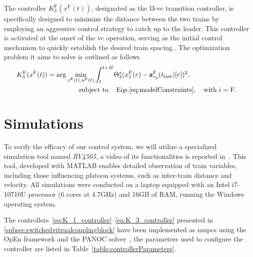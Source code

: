 \documentclass[letterpaper, 10 pt, conference]{ieeeconf}
\theoremstyle{definition}
\theoremstyle{nopoint}
\newcommand{\tildeAdd}{~}
\begin{document}
The controller $K^{\mathrm{F}}_3(x^{\mathrm{F}}(t))$, designated as the \gls{l3}-\gls{vc} transition controller, is specifically designed to minimize the distance between the two trains by employing an aggressive control strategy to catch up to the leader. This controller is activated at the onset of the \gls{vc} operation, serving as the initial control mechanism to quickly establish the desired train spacing.. The optimization problem it aims to solve is outlined as follows
%
\begin{equation}
	\label{eq:K_3_controller}
	\begin{aligned}
		K^{\mathrm{F}}_3(x^\mathrm{F}(t)) = \arg  \min_{x^{\mathrm{F}}(t), u^{\mathrm{F}}(t)} \int_{t}^{t+H}& \Theta^s_3(x_1^{\mathrm{F}}(r)-\mathbf{z}_{\tau_2}^\mathrm{F}(t_{\mathrm{last}})[r])^2, \\
		&	\hspace{-1.8cm} \text{subject to} \qquad \hspace{-1cm}  \qquad \mathrm{Eqs.}\eqref{eq:modelConstraints}, \quad \mathrm{with} \; i = \mathrm{F}.
	\end{aligned}
\end{equation}






 
\section{Simulations}
 \label{sec:Simulations}
 
  To verify the efficacy of our control system, we will utilize a specialized simulation tool named \textit{RV4565}, a video of its functionalities is reported in\tildeAdd\cite{youtubeVideo}. This tool, developed with MATLAB enables detailed observation of train variables, including those influencing platoon systems, such as inter-train distance and velocity. All simulations were conducted on a laptop equipped with an Intel i7-10710U processor (6 cores at 4.7GHz) and 16GB of RAM, running the Windows operating system.
  
  
  The controllers\tildeAdd\eqref{eq:K_1_controller}–\eqref{eq:K_3_controller} presented in \ref{subsec:switchedvitrualcouplingblock} have been implemented as \glspl{nmpc} using the OpEn framework and the PANOC solver\tildeAdd\cite{open2020}, the parameters used to configure the controller are listed in Table\tildeAdd\ref{table:controllerParameters}. 
  
\end{document}
